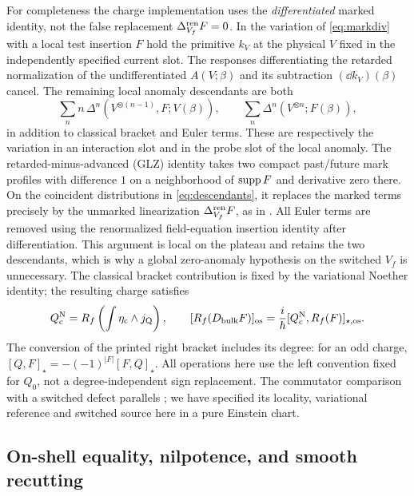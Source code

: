 For completeness the charge implementation uses the \emph{differentiated} marked identity, not the false replacement \(\Delta_{V_f}^{\rm ren}F=0\). In the variation of \eqref{eq:markdiv} with a local test insertion \(F\) hold the primitive \(k_V\) at the physical \(V\) fixed in the independently specified current slot. The responses differentiating the retarded normalization of the undifferentiated \(A(V;\beta)\) and its subtraction \((\dd k_V)(\beta)\) cancel. The remaining local anomaly descendants are both
\begin{equation}
  \sum_n n\,\Delta^n(V^{\otimes(n-1)},F;V(\beta)),
   \qquad
  \sum_n\Delta^n(V^{\otimes n};F(\beta)),
  \label{eq:descendants}
\end{equation}
in addition to classical bracket and Euler terms. These are respectively the variation in an interaction slot and in the probe slot of the local anomaly. The retarded-minus-advanced (GLZ) identity takes two compact past/future mark profiles with difference \(1\) on a neighborhood of \(\operatorname{supp} F\) and derivative zero there. On the coincident distributions in \eqref{eq:descendants}, it replaces the marked terms precisely by the unmarked linearization \(\Delta_{V_f}^{\rm ren}F\), as in \cite[Eqs.~(43), (70)]{Rejzner}. All Euler terms are removed using the renormalized field-equation insertion identity after differentiation. This argument is local on the plateau and retains the two descendants, which is why a global zero-anomaly hypothesis on the switched \(V_f\) is unnecessary. The classical bracket contribution is fixed by the variational Noether identity; the resulting charge satisfies
\begin{equation}
 Q_{\mathrm c}^{\rm N}=R_f\left(\int\eta_{\rm c}\wedge j_{\rm Q}\right),
 \qquad
 [R_f(D_{\mathrm{bulk}} F)]_{\rm os}
  =\frac{i}{\hbar}[Q_{\mathrm c}^{\rm N},R_f(F)]_{\star,{\rm os}} .
 \label{eq:inner}
\end{equation}
The conversion of the printed right bracket includes its degree: for an odd charge, \([Q,F]_\star=-(-1)^{|F|}[F,Q]_\star\). All operations here use the left convention fixed for \(Q_0\), not a degree-independent sign replacement. The commutator comparison with a switched defect parallels \cite[Thms.~15--17, Eq.~(102)]{TT}; we have specified its locality, variational reference and switched source here in a pure Einstein chart.

\subsection{On-shell equality, nilpotence, and smooth recutting}

